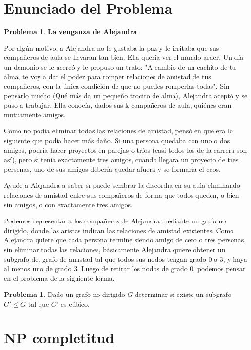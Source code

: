 \documentclass[10pt]{amsart}
\theoremstyle{definition}
\newtheorem{prob}[theorem]{Problema}
\numberwithin{equation}{section}
\begin{document}

\section{Enunciado del Problema}
	\begin{prob} 
		\textbf{La venganza de Alejandra}
		
		Por algún motivo, a Alejandra no le gustaba la paz y le irritaba que sus compañeros de aula se llevaran tan bien. Ella quería ver el mundo arder. Un día un demonio se le acercó y le propuso un trato: "A cambio de un cachito de tu alma, te voy a dar el poder para romper relaciones de amistad de tus compañeros, con la única condición de que no puedes romperlas todas". Sin pensarlo mucho (Qué más da un pequeño trocito de alma), Alejandra aceptó y se puso a trabajar. Ella conocía, dados sus k compañeros de aula, quiénes eran mutuamente amigos.
		
		Como no podía eliminar todas las relaciones de amistad, pensó en qué era lo siguiente que podía hacer más daño. Si una persona quedaba con uno o dos amigos, podría hacer proyectos en parejas o tríos (casi todos los de la carrera son así), pero si tenía exactamente tres amigos, cuando llegara un proyecto de tres personas, uno de sus amigos debería quedar afuera y se formaría el caos.
		
		Ayude a Alejandra a saber si puede sembrar la discordia en su aula eliminando relaciones de amistad entre sus compañeros de forma que todos queden, o bien sin amigos, o con exactamente tres amigos.
	\end{prob}	

	Podemos representar a los compa\~neros de Alejandra mediante un grafo no dirigido, donde las aristas indican las relaciones de amistad existentes. Como Alejandra quiere que cada persona termine siendo amigo de cero o tres personas, sin eliminar todas las relaciones, b\'asicamente Alejandra quiere obtener un subgrafo del grafo de amistad tal que todos sus nodos tengan grado $0$ o $3$, y haya al menos uno de grado $3$. Luego de retirar los nodos de grado $0$, podemos pensar en el problema de la siguiente forma.
	
	\begin{prob}\label{rephrased}
		Dado un grafo no dirigido $G$ determinar si existe un subgrafo $G' \le G$ tal que $G'$ es c\'ubico.
	\end{prob}

\section{NP completitud}
\end{document}
